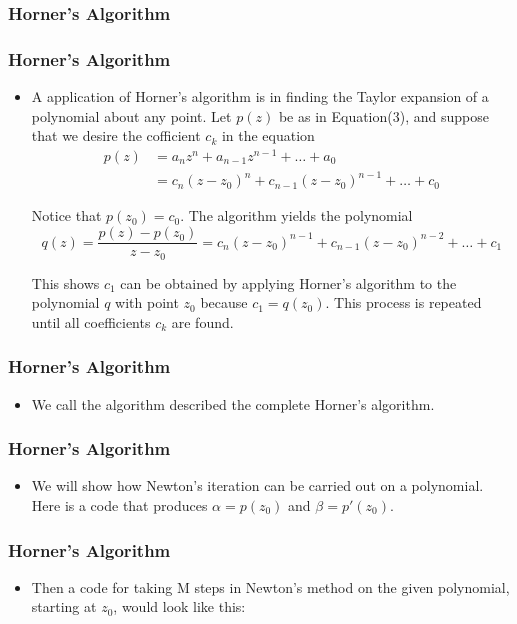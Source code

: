 \documentclass[notheorems,mathserif,table,compress]{beamer}  %
\begin{document}
\begin{frame}
\frametitle{Horner's Algorithm}

\end{frame}

\begin{frame}
\frametitle{Horner's Algorithm}
\begin{itemize}
\item A application of Horner's algorithm is in finding the Taylor expansion of a polynomial about any point. Let $p(z)$ be as in Equation(3), and suppose that we desire the cofficient $c_k$ in the equation
\begin{equation*}
\begin{split}
p(z) & =a_n z^n+a_{n-1} z^{n-1}+\ldots+a_0\\
     & =c_n(z-z_0)^n+c_{n-1}(z-z_0)^{n-1}+\ldots+c_0
\end{split}
\end{equation*}
 
Notice that $p(z_0)=c_0$. The algorithm yields the polynomial
\begin{displaymath}
q(z)=\frac{p(z)-p(z_0)}{z-z_0}=c_n(z-z_0)^{n-1}+c_{n-1}(z-z_0)^{n-2}+\ldots+c_1
\end{displaymath}

This shows $c_1$ can be obtained by applying Horner's algorithm to the polynomial $q$ with point $z_0$ because $c_1=q(z_0)$. This process is repeated until all coefficients $c_k$ are found.
\end{itemize}
\end{frame}

\begin{frame}
\frametitle{Horner's Algorithm}
\begin{itemize}
\item We call the algorithm described the \textsf{complete Horner's algorithm}.

\end{itemize}
\end{frame}

\begin{frame}
\frametitle{Horner's Algorithm}
\begin{itemize}
\item We will show how Newton's iteration can be carried out on a polynomial. Here is a code that produces $\alpha=p(z_0)$ and $\beta=p'(z_0)$.

\end{itemize}
\end{frame}

\begin{frame}
\frametitle{Horner's Algorithm}
\begin{itemize}
\item Then a code for taking M steps in Newton's method on the given polynomial, starting at $z_0$, would look like this: 

\end{itemize}
\end{frame}
\end{document}
